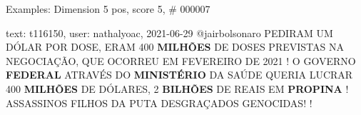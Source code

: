 \begin{frame}{Examples: Dimension 5 pos, score 5, \# 000007}
\footnotesize
\begin{exampleblock}{text: t116150, user: nathalyoac, 2021-06-29}
@jairbolsonaro PEDIRAM UM DÓLAR POR DOSE, ERAM 400 \textbf{MILHÕES} DE DOSES 
PREVISTAS NA NEGOCIAÇÃO, QUE OCORREU EM FEVEREIRO DE 2021 ! O GOVERNO 
\textbf{FEDERAL} ATRAVÉS DO \textbf{MINISTÉRIO} DA SAÚDE QUERIA LUCRAR 400 
\textbf{MILHÕES} DE DÓLARES, 2 \textbf{BILHÕES} DE REAIS EM \textbf{PROPINA} ! 
ASSASSINOS FILHOS DA PUTA DESGRAÇADOS GENOCIDAS! ! 
\end{exampleblock}
\end{frame}
